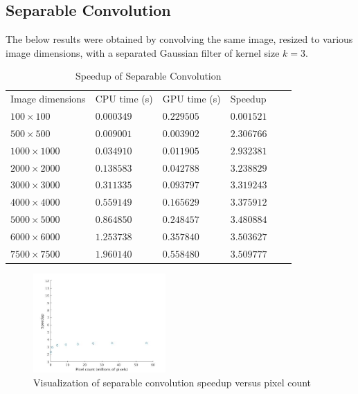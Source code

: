 \documentclass[journal]{IEEEtran}
\begin{document}
\subsection{Separable Convolution}
The below results were obtained by convolving the same image, resized to various image dimensions, with a separated Gaussian filter of kernel size $k = 3$.
\begin{table}[H]
	\small
	\centering
	\caption{Speedup of Separable Convolution}
	\label{separable-convolution-speedup}
	\begin{tabular}{llllll}
	 Image dimensions & CPU time (s) & GPU time (s) & Speedup \\
	 $100 \times 100$ & $0.000349$ & $0.229505$ & $0.001521$ \\
	 $500 \times 500$ & $0.009001$ & $0.003902$ & $2.306766$ \\
	 $1000 \times 1000$ & $0.034910$ & $0.011905$ & $2.932381$ \\
	 $2000 \times 2000$ & $0.138583$ & $0.042788$ & $3.238829$ \\
	 $3000 \times 3000$ & $0.311335$ & $0.093797$ & $3.319243$ \\
	 $4000 \times 4000$ & $0.559149$ & $0.165629$ & $3.375912$ \\
	 $5000 \times 5000$ & $0.864850$ & $0.248457$ & $3.480884$ \\
	 $6000 \times 6000$ & $1.253738$ & $0.357840$ & $3.503627$ \\
	 $7500 \times 7500$ & $1.960140$ & $0.558480$ & $3.509777$ \\
	\end{tabular}
\end{table}
\begin{figure}[h]
	\centering
	\includegraphics[width=0.45\textwidth]{separable_convolution_speedup_graph.jpg}
	\caption{Visualization of separable convolution speedup versus pixel count}
    \label{separable-convolution-speedup-graph}
\end{figure}
\end{document}
